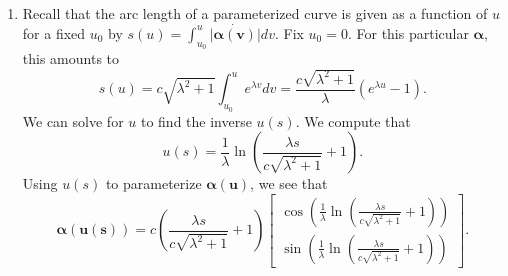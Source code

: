 \documentclass[12pt]{article}
\begin{document}
\begin{enumerate}[label=\Alph*.]
\begin{enumerate}[label=\theenumi\Alph*]
\begin{equation*}
\begin{bmatrix}
                \lambda a - b\\
                \lambda b + a
            \end{bmatrix}=a(\lambda a - b) + b(\lambda b + b)=\lambda c^2e^{2\lambda u}.
        \end{equation*}
        Putting it all together, we see that
        \begin{equation*}
            \arccos(\frac{\bm{\alpha} \cdot \bm{\dot{\alpha}}}{\vert \bm{\alpha}\vert \vert \bm{\dot{\alpha}} \vert})=\arccos{\frac{\lambda c^2e^{2\lambda u}}{(ce^{\lambda u})(ce^{\lambda u}\sqrt{\lambda^2 + 1})}}=\arccos({\frac{\lambda}{\sqrt{\lambda^2 + 1}}}),
        \end{equation*} which is $\theta$ and constant.
        \item Recall that the arc length of a parameterized curve is given as a function of $u$ for a fixed $u_0$ by $s(u)=\int_{u_0}^{u}\vert \bm{\dot{\alpha(v)}}\vert dv$. Fix $u_0=0$. For this particular $\bm{\alpha}$, this amounts to\begin{equation*}
            s(u)=c\sqrt{\lambda^2 + 1}\int_{u_0}^{u}e^{\lambda v} dv=\frac{c\sqrt{\lambda^2 + 1}}{\lambda}(e^{\lambda u}-1).
        \end{equation*} We can solve for $u$ to find the inverse $u(s)$. We compute that
        \begin{equation*}
            u(s)=\frac{1}{\lambda}\ln(\frac{\lambda s}{c\sqrt{\lambda^2 + 1}}+1).
        \end{equation*}
        Using $u(s)$ to parameterize $\bm{\alpha(u)}$, we see that
        \begin{equation*}
            \bm{\alpha(u(s))}=c(\frac{\lambda s}{c\sqrt{\lambda^2 + 1}}+1)\begin{bmatrix}
                \cos (\frac{1}{\lambda}\ln(\frac{\lambda s}{c\sqrt{\lambda^2 + 1}}+1))\\
                \sin (\frac{1}{\lambda}\ln(\frac{\lambda s}{c\sqrt{\lambda^2 + 1}}+1))
            \end{bmatrix}.
        \end{equation*}
    \end{enumerate}
\end{enumerate}
\end{document}
